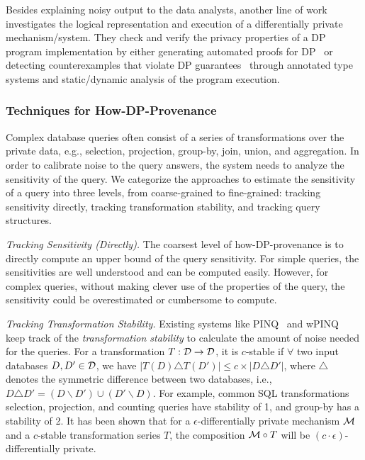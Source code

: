 Besides explaining noisy output to the data analysts, another line of work investigates the logical representation and execution of a differentially private mechanism/system.
They check and verify the privacy properties of a DP program implementation by either generating automated proofs for DP~\cite{wang2021dpgen,abuah2021dduo,wang2020checkdp,wang2019proving,zhang2017lightdp,near2019duet,solo22} or detecting counterexamples that violate DP guarantees~\cite{ding2018detecting,bichsel2018dp,bichsel2021dp,barthe2020deciding} through annotated type systems and static/dynamic analysis of the program execution.



\subsubsection{Techniques for How-DP-Provenance}

Complex database queries often consist of a series of transformations over the private data, e.g., selection, projection, group-by, join, union, and aggregation. 
In order to calibrate noise to the query answers, the system needs to analyze the sensitivity of the query.
We categorize the approaches to estimate the sensitivity of a query into three levels, from coarse-grained to fine-grained: tracking sensitivity directly, tracking transformation stability, and tracking query structures.

\noindent
\emph{Tracking Sensitivity (Directly).}
The coarsest level of how-DP-provenance is to directly compute an upper bound of the query sensitivity.
For simple queries, the sensitivities are well understood and can be computed easily.
However, for complex queries, without making clever use of the properties of the query, the sensitivity could be overestimated or cumbersome to compute.

\noindent
\emph{Tracking Transformation Stability.}
Existing systems like PINQ~\cite{mcsherry2009pinq} and wPINQ~\cite{ProserpioGM14wpinq} keep track of the \textit{transformation stability} to calculate the amount of noise needed for the queries.
For a transformation $T: \mathcal{D} \rightarrow \mathcal{D}$, it is $c$-stable if $\forall$ two input databases $D, D' \in \mathcal{D}$, we have $| T(D) \triangle T(D') | \leq c \times |D \triangle D'|$, where $\triangle$ denotes the symmetric difference between two databases, i.e., $D \triangle D' = (D \backslash D') \cup (D' \backslash D)$.
For example, common SQL transformations selection, projection, and counting queries have stability of 1, and group-by has a stability of 2.
It has been shown that for a $\epsilon$-differentially private mechanism $\mathcal{M}$ and a $c$-stable transformation series $T$, the composition $\mathcal{M} \circ T$ will be $(c \cdot \epsilon)$-differentially private.


